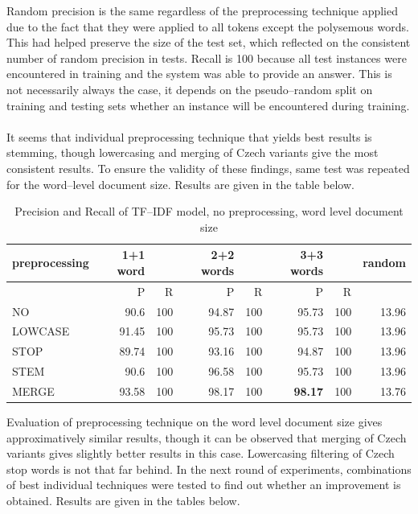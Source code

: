 Random precision is the same regardless of the preprocessing technique applied due to the fact that 
they were applied to all tokens except the polysemous words. This had helped preserve the size of the 
test set, which reflected on the consistent number of random precision in tests. Recall is 100 because all test instances were encountered in training and the system was able to
provide an answer. This is not necessarily always the case, it depends on the pseudo--random split on 
training and testing sets  whether an instance will be encountered during training. 
\\\\
It seems that individual 
 preprocessing technique that yields best results is stemming, though lowercasing and merging of Czech variants give the most consistent results. To ensure the validity of these findings, same test was repeated for the word--level document size. Results are given in the table below.  
\begin{table}[h!]
\begin{tabular}{ l | r r | r r | r r | r}
   preprocessing & 1+1 word && 2+2 words && 3+3 words  && random\\
\hline\hline
	& P  &  R & P  &  R & P  &  R &\\
\hline
NO  & 90.6 & 100 & 94.87 & 100 & 95.73 & 100 & 13.96 \\
LOWCASE  & 91.45 & 100 & 95.73 & 100 & 95.73 & 100 & 13.96 \\
 STOP  & 89.74 & 100 & 93.16 & 100 & 94.87 & 100 & 13.96  \\
 STEM  & 90.6 & 100 & 96.58 & 100 & 95.73 & 100 & 13.96 \\
MERGE  & 93.58 & 100 & 98.17 & 100 & \textbf{98.17} & 100 & 13.76  \\
\end{tabular}
\caption{Precision and Recall of TF--IDF model, no preprocessing, word level document size}
\end{table}

Evaluation of preprocessing technique on the word level document size gives approximatively similar results, though it can be observed that merging of Czech variants gives slightly better results in this case. Lowercasing filtering of Czech stop words is not that far behind. In the next round of experiments, combinations of best individual techniques were tested to find out whether an improvement is obtained. 
Results are given in the tables below. 


